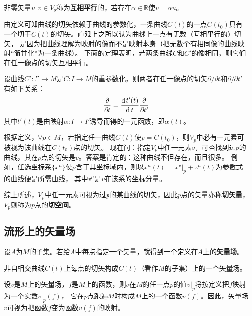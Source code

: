 \begin{definition}
非零矢量$u, v \in V_p$称为\textbf{互相平行}的，若存在$\alpha \in \mathbb{R}$使$v = \alpha u$。
\end{definition}

由定义可知曲线的切矢依赖于曲线的参数化，一条曲线$C(t)$的一点$C(t_0)$只有一个切于$C(t)$的切矢。直观上之所以认为曲线上一点有无数（互相平行的）切矢，
是因为把曲线理解为映射的像而不是映射本身（把无数个有相同像的曲线映射``简并化''为一条曲线）。
下面的定理表明，若两条曲线$C$和$C'$的像相同，则它们在任一像点的切矢互相平行。

\begin{theorem}
设曲线$C' \colon I' \to M$是$C \colon I \to M$的重参数化，则两者在任一像点的切矢$\partial / \partial t$和$\partial / \partial t'$有如下关系：
$$\frac{\partial}{\partial t} = \frac{\operatorname{d} t'(t)}{\operatorname{d} t}\frac{\partial}{\partial t'}$$
其中$t'(t)$是由映射$\alpha \colon I \to I'$诱导而得的一元函数，即$\alpha(t)$。
\end{theorem}

根据定义，$\forall p \in M$，若指定任一曲线$C(t)$使$p = C(t_0)$，则$V_p$中必有一元素可被视为该曲线在$C(t_0)$点的切矢。
现在问：指定$V_p$中任一元素$v$，可否找到过$p$的曲线，其在$p$点的切矢是$v$。答案是肯定的：这种曲线不但存在，而且很多。
例如，任选坐标系$\{x^\mu\}$使$p$含于其坐标域内，则以$x^\mu(t) = x^\mu|_p + v^\mu(t)$为参数式的曲线便是所需曲线，
其中$v^\mu$是$v$在该系的坐标分量。

综上所述，$V_p$中任一元素可视为过$p$的某曲线的切矢，因此$p$点的矢量亦称\textbf{切矢量}，$V_p$则称为$p$点的\textbf{切空间}。

\subsection{流形上的矢量场}

\begin{definition}
设$A$为$M$的子集。若给$A$中每点指定一个矢量，就得到一个定义在$A$上的\textbf{矢量场}。
\end{definition}

\begin{example}
非自相交曲线$C(t)$上每点的切矢构成$C(t)$（看作$M$的子集）上的一个矢量场。
\end{example}

设$v$是$M$上的矢量场，$f$是$M$上的函数，则$v$在$M$的任一点$p$的值$v|_p$将按定义把$f$映射为一个实数$v|_p(f)$，
它在$p$点跑遍$M$时构成$M$上的一个函数$v(f)$。因此，矢量场$v$可视为把函数$f$变为函数$v(f)$的映射。

